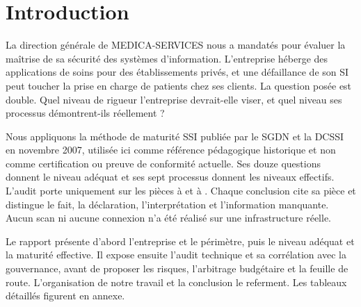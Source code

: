 \section{Introduction}

La direction générale de MEDICA-SERVICES nous a mandatés pour évaluer la maîtrise de sa sécurité des systèmes d'information. L'entreprise héberge des applications de soins pour des établissements privés, et une défaillance de son SI peut toucher la prise en charge de patients chez ses clients. La question posée est double. Quel niveau de rigueur l'entreprise devrait-elle viser, et quel niveau ses processus démontrent-ils réellement ?

Nous appliquons la méthode de maturité SSI publiée par le SGDN et la DCSSI en novembre 2007, utilisée ici comme référence pédagogique historique et non comme certification ou preuve de conformité actuelle. Ses douze questions donnent le niveau adéquat et ses sept processus donnent les niveaux effectifs. L'audit porte uniquement sur les pièces  à  et  à . Chaque conclusion cite sa pièce et distingue le fait, la déclaration, l'interprétation et l'information manquante. Aucun scan ni aucune connexion n'a été réalisé sur une infrastructure réelle.

Le rapport présente d'abord l'entreprise et le périmètre, puis le niveau adéquat et la maturité effective. Il expose ensuite l'audit technique et sa corrélation avec la gouvernance, avant de proposer les risques, l'arbitrage budgétaire et la feuille de route. L'organisation de notre travail et la conclusion le referment. Les tableaux détaillés figurent en annexe.
